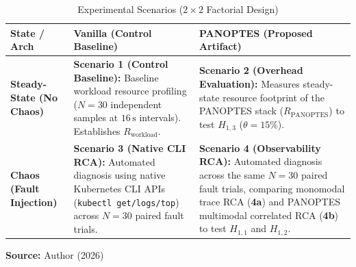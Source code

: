 \begin{table}[ht]
\centering
\caption{Experimental Scenarios ($2\times2$ Factorial Design)}
\label{tab:scenarios}
\begin{tabularx}{\textwidth}{|l|X|X|}
\hline
\textbf{State / Arch} & \textbf{Vanilla (Control Baseline)} & \textbf{PANOPTES (Proposed Artifact)} \\ \hline
\textbf{Steady-State (No Chaos)} & \textbf{Scenario 1 (Control Baseline):} Baseline workload resource profiling ($N=30$ independent samples at $16\,\text{s}$ intervals). Establishes $R_{\text{workload}}$. & \textbf{Scenario 2 (Overhead Evaluation):} Measures steady-state resource footprint of the PANOPTES stack ($R_{\text{PANOPTES}}$) to test $H_{1,3}$ ($\theta = 15\%$). \\ \hline
\textbf{Chaos (Fault Injection)} & \textbf{Scenario 3 (Native CLI RCA):} Automated diagnosis using native Kubernetes CLI APIs (\texttt{kubectl get/logs/top}) across $N=30$ paired fault trials. & \textbf{Scenario 4 (Observability RCA):} Automated diagnosis across the same $N=30$ paired fault trials, comparing monomodal trace RCA (\textbf{4a}) and PANOPTES multimodal correlated RCA (\textbf{4b}) to test $H_{1,1}$ and $H_{1,2}$. \\ \hline
\end{tabularx}
\par\medskip
\small\textbf{Source:} Author (2026)
\end{table}
